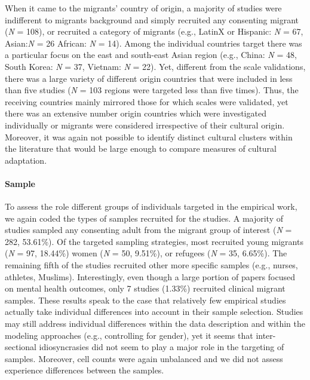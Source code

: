 When it came to the migrants' country of origin, a majority of studies
were indifferent to migrants background and simply recruited any
consenting migrant (\textit{N} = 108), or recruited a category of
migrants (e.g., LatinX or Hispanic: \textit{N} = 67, Asian:\textit{N} =
26 African: \textit{N} = 14). Among the individual countries target
there was a particular focus on the east and south-east Asian region
(e.g., China: \textit{N} = 48, South Korea: \textit{N} = 37, Vietnam:
\textit{N} = 22). Yet, different from the scale validations, there was a
large variety of different origin countries that were included in less
than five studies (\textit{N} = 103 regions were targeted less than five
times). Thus, the receiving countries mainly mirrored those for which
scales were validated, yet there was an extensive number origin
countries which were investigated individually or migrants were
considered irrespective of their cultural origin. Moreover, it was again
not possible to identify distinct cultural clusters within the
literature that would be large enough to compare measures of cultural
adaptation.

\paragraph{Sample}

To assess the role different groups of individuals targeted in the
empirical work, we again coded the types of samples recruited for the
studies. A majority of studies sampled any consenting adult from the
migrant group of interest (\textit{N} = 282, 53.61\%). Of the targeted
sampling strategies, most recruited young migrants (\textit{N} = 97,
18.44\%) women (\textit{N} = 50, 9.51\%), or refugees (\textit{N} = 35,
6.65\%). The remaining fifth of the studies recruited other more
specific samples (e.g., nurses, athletes, Muslims). Interestingly, even
though a large portion of papers focused on mental health outcomes, only
7 studies (1.33\%) recruited clinical migrant samples. These results
speak to the case that relatively few empirical studies actually take
individual differences into account in their sample selection. Studies
may still address individual differences within the data description and
within the modeling approaches (e.g., controlling for gender), yet it
seems that inter-sectional idiosyncrasies did not seem to play a major
role in the targeting of samples. Moreover, cell counts were again
unbalanced and we did not assess experience differences between the
samples.

